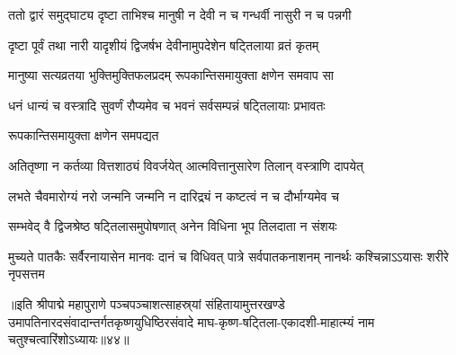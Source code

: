 \twolineshloka
{ततो द्वारं समुद्घाट्य दृष्टा ताभिश्च मानुषी}
{न देवी न च गन्धर्वी नासुरी न च पन्नगी}%

\twolineshloka
{दृष्टा पूर्वं तथा नारी यादृशीयं द्विजर्षभ}
{देवीनामुपदेशेन षट्तिलाया व्रतं कृतम्}%

\twolineshloka
{मानुष्या सत्यव्रतया भुक्तिमुक्तिफलप्रदम्}
{रूपकान्तिसमायुक्ता क्षणेन समवाप सा}%

\twolineshloka
{धनं धान्यं च वस्त्रादि सुवर्णं रौप्यमेव च}
{भवनं सर्वसम्पन्नं षट्तिलायाः प्रभावतः}%

\onelineshloka
{रूपकान्तिसमायुक्ता क्षणेन समपद्यत}%

\twolineshloka
{अतितृष्णा न कर्तव्या वित्तशाठ्यं विवर्जयेत्}
{आत्मवित्तानुसारेण तिलान् वस्त्राणि दापयेत्}%

\twolineshloka
{लभते चैवमारोग्यं नरो जन्मनि जन्मनि}
{न दारिद्र्यं न कष्टत्वं न च दौर्भाग्यमेव च}%

\twolineshloka
{सम्भवेद् वै द्विजश्रेष्ठ षट्तिलासमुपोषणात्}
{अनेन विधिना भूप तिलदाता न संशयः}%

\threelineshloka
{मुच्यते पातकैः सर्वैरनायासेन मानवः}
{दानं च विधिवत् पात्रे सर्वपातकनाशनम्}
{नानर्थः कश्चिन्नाऽऽयासः शरीरे नृपसत्तम}%


॥इति श्रीपाद्मे महापुराणे पञ्चपञ्चाशत्साहस्र्यां संहितायामुत्तरखण्डे उमापतिनारदसंवादान्तर्गतकृष्णयुधिष्ठिरसंवादे माघ-कृष्ण-षट्तिला-एकादशी-माहात्म्यं नाम चतुश्चत्वारिंशोऽध्यायः॥४४॥

\genMangalaShloka

\hyperref[sec:ekadashi_mahatmyam_padma_puranam]{\closesub}
\clearpage

